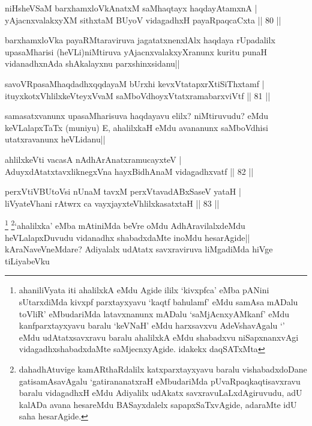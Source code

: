 \begin{shl}
niHsheVSaM barxhamxloVkAnatxM saMhaqtayx haqdayAtamxnA |\\
yAjacnxvalakxyXM sithxtaM BUyoV vidagadhxH payaRpaqcaCxta \hfill || 80 ||
\end{shl}

\begin{artha}
barxhamxloVka payaRMtaraviruva jagatatxnenxlAlx haqdaya rUpadalilx upasaMharisi (heVLi)niMtiruva yAjacnxvalakxyXranunx kuritu punaH vidanadhxnAda shAkalayxnu parxshinxsidanu||
\end{artha}

\begin{shl}
savoVRpasaMhaqdadhxqqdayaM bUrxhi kevxVtatapxrXtiSiThxtamf |\\
ituyxkotxV\s hlilxkeVteyxVvaM saMboVdhoyxVtatxramabarxviVtf \hfill || 81 ||
\end{shl}

\begin{artha}
samasatxvanunx upasaMharisuva haqdayavu elilx? niMtiruvudu? eMdu keVLalapxTaTx (muniyu) E, ahalilxkaH eMdu avananunx saMboVdhisi utatxravanunx heVLidanu||
\end{artha}

\begin{shl}
ahlilxkeVti vacasA nA\s \s dhArAnatxramucayxteV |\\
AduyxdAtatxtavxliknegxVna hayxBidhAnaM vidagadhxvatf \hfill || 82 ||
\end{shl}

\begin{shl}
perxVtiVBUtoV\s si nUnaM tavxM perxVtavadABxSaseV yataH |\\
liVyateV\s hani rAtwrx ca vayxjayxteV\s hlilxkasatxtaH \hfill || 83 ||
\end{shl}

\begin{artha}
\footnote[1]{ahaniliVyata iti ahalilxkA eMdu Agide ililx `kivxpfca' eMba pANini sUtarxdiMda kivxpf parxtayxyavu `kaqtf bahulamf' eMdu samAsa mADalu toVliR' eMbudariMda latavxnanunx mADalu `saMjAcnxyAMkanf' eMdu kanfparxtayxyavu baralu `keV\s NaH' eMdu harxsavxvu AdeVshavAgalu `\stext ' eMdu udAtatxsavxravu baralu ahalilxkA eMdu shabadxvu niSapxnanxvAgi vidagadhxshabadxdaMte saMjecnxyAgide. idakekx daqSATxMta}
\footnote[2]{dahadhAtuvige kamARthaRdalilx katxparxtayxyavu baralu vishabadxdoDane gatisamAsavAgalu `gatirananatxraH eMbudariMda pUvaRpaqkaqtisavxravu baralu vidagadhxH eMdu Adiyalilx udAkatx savxravuLaLxdAgiruvudu, adU kalADa avana hesareMdu BASayxdalelx sapapxSaTxvAgide, adaraMte idU saha hesarAgide.}`ahalilxka' eMba mAtiniMda beVre oMdu AdhAravilalxdeMdu heVLalapxDuvudu vidanadhx shabadxdaMte inoMdu hesarAgide|| kAraNaveVneMdare? Adiyalalx udAtatx savxraviruva liMgadiMda hiVge tiLiyabeVku
\end{artha}

